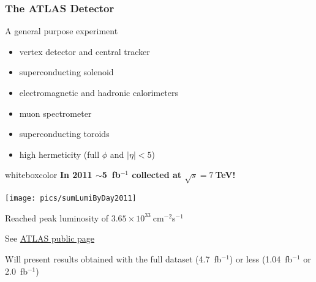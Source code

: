 \documentclass[xcolor=dvipsnames,10pt]{beamer}
\newcommand\BackgroundPicture[1]{%
   \setbeamertemplate{background}{%
   \parbox[c][\paperheight]{\paperwidth}{%
       \vfill \hfill
\texttt{[image: \#1]}
        \hfill \vfill
     }}}
\begin{document}
\begin{frame}\frametitle{The ATLAS Detector}
\footnotesize\centering

\footnotesize
\begin{minipage}{.35\textwidth}
A general purpose experiment
\begin{itemize}
\item vertex detector and central tracker
\item superconducting solenoid
\item electromagnetic and hadronic calorimeters
\item muon spectrometer
\item superconducting toroids
\item high hermeticity (full $\phi$ and $|\eta|<5$)
\end{itemize}
\end{minipage}\begin{minipage}{.6\textwidth}\centering\pause
\hspace{2cm}\begin{beamercolorbox}[wd=.9\textwidth,rounded=true,shadow=true]{whiteboxcolor}\centering
{\bfseries In 2011 $\sim$5~fb$^{-1}$ collected at $\sqrt{s}=7~$TeV!}
\vspace{.3cm}

\texttt{[image: pics/sumLumiByDay2011]}

\vspace{\baselineskip}
Reached peak luminosity of $3.65\times 10^{33}~$cm$^{-2}$s$^{-1}$\\
\end{beamercolorbox}

See \href{https://twiki.cern.ch/twiki/bin/view/AtlasPublic}{ATLAS public page}

\end{minipage}

\pause

Will present results obtained with the full dataset (4.7~fb$^{-1}$) or less (1.04~fb$^{-1}$ or 2.0~fb$^{-1}$)

\end{frame}




\BackgroundPicture{pics/emptyIMG}
\end{document}
